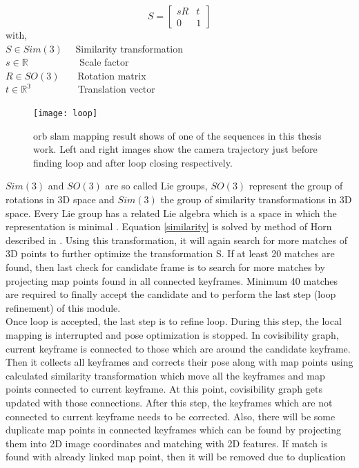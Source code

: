 \begin{equation*}
S = 
\begin{bmatrix}
sR & t \\
0 & 1
\end{bmatrix}
\label{similarity}
\end{equation*} 
with,\\
$ S \in Sim(3)$  \ \ Similarity transformation \\
$ s \in \mathbb{R}$ \ \ \ \ \ \ \ \ \ \ Scale factor \\
$ R \in SO(3) $  \ \ \   Rotation matrix \\
$ t \in \mathbb{R^{3}} $ \ \ \ \ \ \ \ \ \ Translation vector
\begin{figure}[H]
	\centering
	\texttt{[image: loop]}
	\caption{\acrshort{orb} \acrshort{slam} mapping result shows of one of the sequences in this thesis work. Left and right images show the camera trajectory just before finding loop and after loop closing respectively.}
	\label{fig:loop}
\end{figure}
\noindent $ Sim(3) $ and $ SO(3) $ are so called Lie groups, $ SO(3)$ represent the group of rotations in 3D space and $ Sim(3) $ the group of similarity transformations in 3D space. Every Lie group has a related Lie algebra which is a space in which the representation is minimal \cite{multiview_geometry}. Equation \ref{similarity} is solved by method of Horn described in \cite{Horn}. Using this transformation, it will again search for more matches of 3D points to further optimize the transformation S. If at least 20 matches are found, then last check for candidate frame is to search for more matches by projecting map points found in all connected keyframes. Minimum 40 matches are required to finally accept the candidate and to perform the last step (loop refinement) of this module. \\
\newline 
Once loop is accepted, the last step is to refine loop. During this step, the local mapping is interrupted and pose optimization is stopped. In covisibility graph, current keyframe is connected to those which are around the candidate keyframe. Then it collects all keyframes and corrects their pose along with map points using calculated similarity transformation which move all the keyframes and map points connected to current keyframe. At this point, covisibility graph gets updated with those connections. After this step, the keyframes which are not connected to current keyframe needs to be corrected. Also, there will be some duplicate map points in connected keyframes which can be found by projecting them into 2D image coordinates and matching with 2D features. If match is found with already linked map point, then it will be removed due to duplication \\
